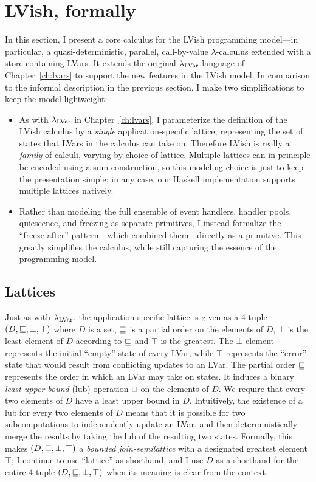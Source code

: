 \section{LVish, formally}\label{s:quasi-formal}


In this section, I present a core calculus for the LVish programming
model---in particular, a quasi-deterministic, parallel, call-by-value
$\lambda$-calculus extended with a store containing LVars.  It extends
the original $\lambda_{\textrm{LVar}}$ language of Chapter~\ref{ch:lvars} to
support the new features in the LVish model.  In comparison to the
informal description in the previous section, I make two
simplifications to keep the model lightweight:
\begin{itemize}
\item As with $\lambda_{\textrm{LVar}}$ in Chapter~\ref{ch:lvars}, I parameterize
  the definition of the LVish calculus by a \emph{single}
  application-specific lattice, representing the set of states that
  LVars in the calculus can take on. Therefore LVish is really a
  \emph{family} of calculi, varying by choice of lattice.  Multiple
  lattices can in principle be encoded using a sum construction, so
  this modeling choice is just to keep the presentation simple; in any
  case, our Haskell implementation supports multiple lattices
  natively.
\item Rather than modeling the full ensemble of event handlers,
  handler pools, quiescence, and freezing as separate primitives, I
  instead formalize the ``freeze-after'' pattern---which combined
  them---directly as a primitive.  This greatly simplifies the
  calculus, while still capturing the essence of the programming
  model.
\end{itemize}

\subsection{Lattices}

Just as with $\lambda_{\textrm{LVar}}$, the application-specific lattice is given
as a 4-tuple $(D, \sqsubseteq, \bot, \top)$ where $D$ is a set,
$\sqsubseteq$ is a partial order on the elements of $D$, $\bot$ is the
least element of $D$ according to $\sqsubseteq$ and $\top$ is the
greatest.  The $\bot$ element represents the initial ``empty'' state
of every LVar, while $\top$ represents the ``error'' state that would
result from conflicting updates to an LVar.  The partial order
$\sqsubseteq$ represents the order in which an LVar may take on states.
It induces a binary \emph{least upper bound} (lub) operation
$ \sqcup $ on the elements of $D$.  We require that every two
elements of $D$ have a least upper bound in $D$.  Intuitively, the
existence of a lub for every two elements of $D$ means that it is
possible for two subcomputations to independently update an LVar, and
then deterministically merge the results by taking the lub of the
resulting two states.  Formally, this makes $(D, \sqsubseteq, \bot,
\top)$ a \emph{bounded join-semilattice} with a designated greatest
element $\top$; I continue to use ``lattice'' as shorthand, and I use
$D$ as a shorthand for the entire 4-tuple $(D, \sqsubseteq, \bot, \top)$
when its meaning is clear from the context.


